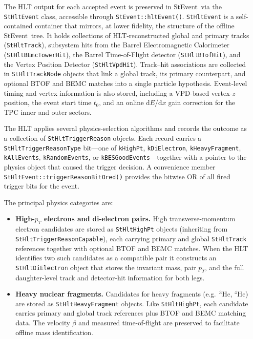 \documentclass[twoside]{article}
\newcommand{\StEvent}{\textsf{StEvent}}
\begin{document}
The HLT output for each accepted event is preserved in \StEvent\ via
the \texttt{StHltEvent} class, accessible through
\texttt{StEvent::hltEvent()}.  \texttt{StHltEvent} is a self-contained
container that mirrors, at lower fidelity, the structure of the offline
\StEvent\ tree.  It holds collections of HLT-reconstructed global and
primary tracks (\texttt{StHltTrack}), subsystem hits from the Barrel
Electromagnetic Calorimeter (\texttt{StHltBEmcTowerHit}), the Barrel
Time-of-Flight detector (\texttt{StHltBTofHit}), and the Vertex
Position Detector (\texttt{StHltVpdHit}).  Track--hit associations are
collected in \texttt{StHltTrackNode} objects that link a global track,
its primary counterpart, and optional BTOF and BEMC matches into a
single particle hypothesis.  Event-level timing and vertex information
is also stored, including a VPD-based vertex-$z$ position, the event
start time $t_0$, and an online d$E$/d$x$ gain correction for the TPC
inner and outer sectors.

The HLT applies several physics-selection algorithms and records the
outcome as a collection of \texttt{StHltTriggerReason} objects.  Each
record carries a \texttt{StHltTriggerReasonType} bit---one of
\texttt{kHighPt}, \texttt{kDiElectron}, \texttt{kHeavyFragment},
\texttt{kAllEvents}, \texttt{kRandomEvents}, or
\texttt{kBESGoodEvents}---together with a pointer to the physics
object that caused the trigger decision.  A convenience member
\texttt{StHltEvent::triggerReasonBitOred()} provides the bitwise OR of
all fired trigger bits for the event.

The principal physics categories are:

\begin{itemize}

\item \textbf{High-$p_T$ electrons and di-electron pairs.}
      High transverse-momentum electron candidates are stored as
      \texttt{StHltHighPt} objects (inheriting from
      \texttt{StHltTriggerReasonCapable}), each carrying primary and
      global \texttt{StHltTrack} references together with optional BTOF
      and BEMC matches.  When the HLT identifies two such candidates as
      a compatible pair it constructs an \texttt{StHltDiElectron}
      object that stores the invariant mass, pair $p_T$, and the full
      daughter-level track and detector-hit information for both legs.

\item \textbf{Heavy nuclear fragments.}
      Candidates for heavy fragments (e.g.\ ${}^3\mathrm{He}$,
      ${}^4\mathrm{He}$) are stored as \texttt{StHltHeavyFragment}
      objects.  Like \texttt{StHltHighPt}, each candidate carries
      primary and global track references plus BTOF and BEMC matching
      data.  The velocity $\beta$ and measured time-of-flight are
      preserved to facilitate offline mass identification.

\end{itemize}
\end{document}
